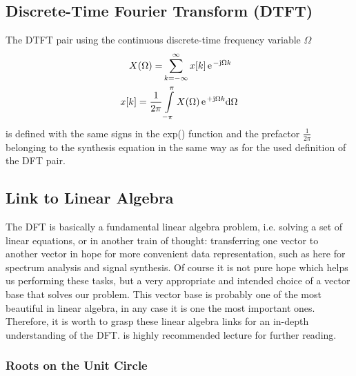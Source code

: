 \documentclass[11pt,a4paper,DIV=12]{scrartcl}
\begin{document}
\subsection{Discrete-Time Fourier Transform (DTFT)}
The DTFT pair using the continuous discrete-time
frequency variable $\Omega$
\begin{align}
X(\Omega)=&\sum_{k=-\infty}^\infty x[k]\,\e^{-\im\Omega k}
\label{eq:DTFT}\\
x[k]=\frac{1}{2\pi}&\int\limits_{-\pi}^\pi X(\Omega)\,\e^{+\im\Omega k}\text{d}\Omega
\end{align}
is defined with the same signs in the exp() function
and the prefactor $\frac{1}{2\pi}$
belonging to the synthesis equation in the same way as for the used definition
of the DFT pair.

\subsection{Link to Linear Algebra}
The DFT is basically a fundamental linear algebra problem, i.e.
solving a set of linear equations, or in another train of thought: transferring
one vector to another vector in hope for more convenient data representation,
such as here for spectrum analysis and signal synthesis.
%
Of course it is not pure hope which helps us performing these tasks, but
a very appropriate and intended choice of a vector base that solves our problem.
%
This vector base is probably one of the most beautiful in linear algebra,
in any case it is one the most important ones.
%
Therefore, it is worth to grasp these linear algebra links for an in-depth
understanding of the DFT.
%
\cite{Strang2019} is highly recommended lecture for further reading.

\subsubsection{Roots on the Unit Circle}
\end{document}
